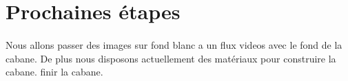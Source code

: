 \documentclass{article}
\begin{document}
\section{Prochaines étapes}
\paragraph{}
Nous allons passer des images sur fond blanc a un flux videos avec le fond de la cabane. De plus nous disposons actuellement des matériaux pour construire la cabane. finir la cabane. 
\end{document}
